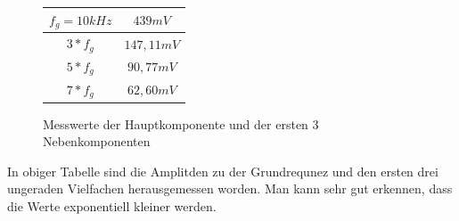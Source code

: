 \begin{figure}[H]
  \begin{center}
    \begin{tabular}{|c|c|} \hline
    $f_g=10kHz$ & $439mV$ \\ \hline
    $3*f_g$ & $147,11mV$ \\ \hline
    $5*f_g$ & $90,77mV$ \\ \hline
    $7*f_g$ & $62,60mV$ \\ \hline
    \end{tabular}
  \end{center}
  \caption{Messwerte der Hauptkomponente und der ersten 3 Nebenkomponenten}
\end{figure}
\noindent
In obiger Tabelle sind die Amplitden zu der Grundrequnez und den ersten drei ungeraden Vielfachen herausgemessen worden. Man kann sehr gut erkennen, dass die Werte exponentiell kleiner werden. 
